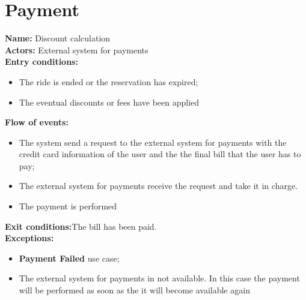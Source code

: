 \section*{Payment}
\textbf{Name:} Discount calculation\\
\textbf{Actors:} External system for payments\\
\textbf{Entry conditions:}
\begin{itemize}
\item The ride is ended or the reservation has expired;
\item The eventual discounts or fees have been applied
\end{itemize}
\textbf{Flow of events:}
\begin{itemize}
\item The system send a request to the external system for payments with the credit card information of the user and the the final bill that the user has to pay;
\item The external system for payments receive the request and take it in charge.
\item The payment is performed
\end{itemize}
\textbf{Exit conditions:}The bill has been paid.\\
\textbf{Exceptions:}
\begin{itemize}
\item\textbf{Payment Failed} use case;
\item The external system for payments in not available. In this case the payment will be performed as soon as the it will become available again
\end{itemize}

